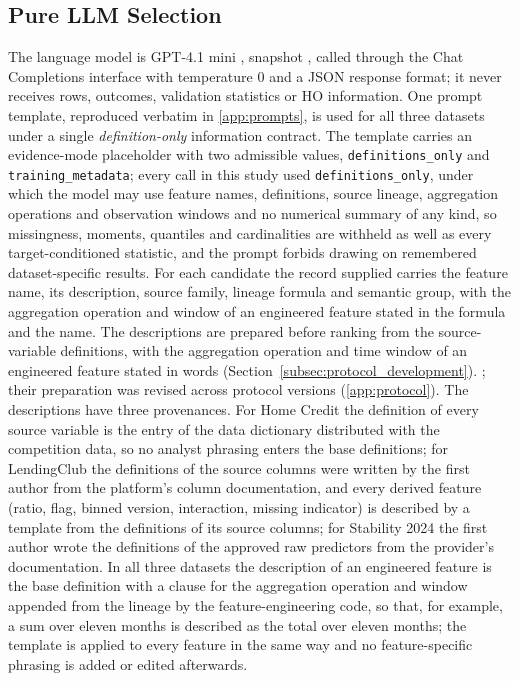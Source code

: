 \documentclass[final,5p,twocolumn]{elsarticle}
\providecommand{\DIFaddtex}[1]{{\protect\color{blue} \sf #1}} %
\providecommand{\DIFdeltex}[1]{{\protect\color{red} \scriptsize #1}} %
\providecommand{\DIFaddbegin}{} %
\providecommand{\DIFaddend}{} %
\providecommand{\DIFdelbegin}{} %
\providecommand{\DIFdelend}{} %
\providecommand{\DIFadd}[1]{\texorpdfstring{\DIFaddtex{#1}}{#1}} %
\providecommand{\DIFdel}[1]{\texorpdfstring{\DIFdeltex{#1}}{}} %
\begin{document}
\subsection{Pure LLM Selection}
\label{subsec:llm_fs}

The language model is GPT-4.1 mini \cite{openai2025gpt41}, snapshot , called through the Chat Completions interface with temperature 0 and a JSON response format; it never receives rows, outcomes, validation statistics or HO information. One prompt template, reproduced verbatim in \ref{app:prompts}, is used for all three datasets under a single \emph{definition-only} information contract. The template carries an evidence-mode placeholder with two admissible values, \texttt{definitions\_only} and \texttt{training\_metadata}; every call in this study used \texttt{definitions\_only}, under which the model may use feature names, definitions, source lineage, aggregation operations and observation windows and no numerical summary of any kind, so missingness, moments, quantiles and cardinalities are withheld as well as every target-conditioned statistic, and the prompt forbids drawing on remembered dataset-specific results. For each candidate the record supplied carries the feature name, its description, source family, lineage formula and semantic group, with the aggregation operation and window of an engineered feature stated in the formula and the name. The descriptions are prepared before ranking from the source-variable definitions, with the aggregation operation and time window of an engineered feature stated in words\DIFdelbegin \DIFdel{(Section~\ref{subsec:protocol_development}). }\DIFdelend \DIFaddbegin \DIFadd{; their preparation was revised across protocol versions (\ref{app:protocol}). The descriptions have three provenances. For Home Credit the definition of every source variable is the entry of the data dictionary distributed with the competition data, so no analyst phrasing enters the base definitions; for LendingClub the definitions of the source columns were written by the first author from the platform's column documentation, and every derived feature (ratio, flag, binned version, interaction, missing indicator) is described by a template from the definitions of its source columns; for Stability 2024 the first author wrote the definitions of the approved raw predictors from the provider's documentation. In all three datasets the description of an engineered feature is the base definition with a clause for the aggregation operation and window appended from the lineage by the feature-engineering code, so that, for example, a sum over eleven months is described as the total over eleven months; the template is applied to every feature in the same way and no feature-specific phrasing is added or edited afterwards. 
}\DIFaddend 
\end{document}
